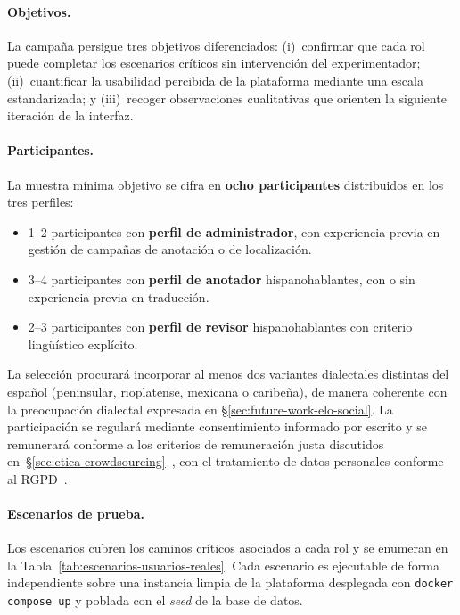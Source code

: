 \paragraph{Objetivos.} La campaña persigue tres objetivos diferenciados:
(i)~confirmar que cada rol puede completar los escenarios críticos sin
intervención del experimentador; (ii)~cuantificar la usabilidad percibida de la
plataforma mediante una escala estandarizada; y (iii)~recoger observaciones
cualitativas que orienten la siguiente iteración de la interfaz.

\paragraph{Participantes.} La muestra mínima objetivo se cifra en
\textbf{ocho participantes} distribuidos en los tres perfiles:

\begin{itemize}
	\item 1--2 participantes con \textbf{perfil de administrador}, con experiencia previa
	      en gestión de campañas de anotación o de localización.
	\item 3--4 participantes con \textbf{perfil de anotador} hispanohablantes, con o sin
	      experiencia previa en traducción.
	\item 2--3 participantes con \textbf{perfil de revisor} hispanohablantes con criterio
	      lingüístico explícito.
\end{itemize}

La selección procurará incorporar al menos dos variantes dialectales distintas
del español (peninsular, rioplatense, mexicana o caribeña), de manera coherente
con la preocupación dialectal expresada en
\S\ref{sec:future-work-elo-social}. La participación se regulará mediante
consentimiento informado por escrito y se remunerará conforme a los criterios
de remuneración justa discutidos
en~\S\ref{sec:etica-crowdsourcing}~\cite{Whiting2019_FairWork,Shmueli2021_BeyondFairPay},
con el tratamiento de datos personales conforme al RGPD~\cite{GDPR2016}.

\paragraph{Escenarios de prueba.} Los escenarios cubren los caminos críticos
asociados a cada rol y se enumeran en la
Tabla~\ref{tab:escenarios-usuarios-reales}. Cada escenario es ejecutable de
forma independiente sobre una instancia limpia de la plataforma desplegada con
\texttt{docker compose up} y poblada con el \textit{seed} de la base de datos.

